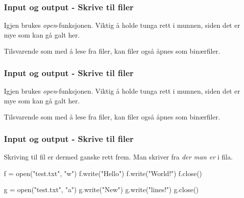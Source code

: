 \begin{frame}[fragile]
    \frametitle{Input og output - Skrive til filer}

    Igjen brukes \textit{open}-funksjonen. Viktig å holde tunga rett i munnen, siden det er mye som kan gå galt her.

    Tilsvarende som med å lese fra filer, kan filer også åpnes som binærfiler. 

\end{frame}

\begin{frame}[fragile]
    \frametitle{Input og output - Skrive til filer}

    Igjen brukes \textit{open}-funksjonen. Viktig å holde tunga rett i munnen, siden det er mye som kan gå galt her.

    Tilsvarende som med å lese fra filer, kan filer også åpnes som binærfiler. 

\end{frame}

\begin{frame}[fragile]
    \frametitle{Input og output - Skrive til filer}

    Skriving til fil er dermed ganske rett frem. Man skriver fra \textit{der man er} i fila. 

\begin{python}
f = open("test.txt", "w")
f.write("Hello\n")
f.write("World!\n")
f.close()

g = open("test.txt", "a")
g.write("New\n")
g.write("lines!\n")
g.close()
\end{python}

\end{frame}


